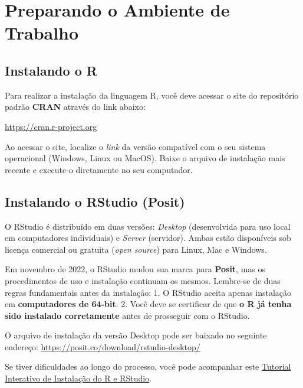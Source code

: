 \documentclass[
  brazilian,
  11pt,
  a4paper,
  open = right,
  twoside = true]{scrbook}
\begin{document}
\section*{Preparando o Ambiente de
Trabalho}\label{preparando-o-ambiente-de-trabalho}


\subsection*{Instalando o R}\label{instalando-o-r}

Para realizar a instalação da linguagem R, você deve acessar o site do
repositório padrão \textbf{CRAN} através do link abaixo:

\url{https://cran.r-project.org}

Ao acessar o site, localize o \emph{link} da versão compatível com o seu
sistema operacional (Windows, Linux ou MacOS). Baixe o arquivo de
instalação mais recente e execute-o diretamente no seu computador.

\subsection*{Instalando o RStudio
(Posit)}\label{instalando-o-rstudio-posit}

O RStudio é distribuído em duas versões: \emph{Desktop} (desenvolvida
para uso local em computadores individuais) e \emph{Server} (servidor).
Ambas estão disponíveis sob licença comercial ou gratuita (\emph{open
source}) para Linux, Mac e Windows.

Em novembro de 2022, o RStudio mudou sua marca para \textbf{Posit}, mas
os procedimentos de uso e instalação continuam os mesmos. Lembre-se de
duas regras fundamentais antes da instalação: 1. O RStudio aceita apenas
instalação em \textbf{computadores de 64-bit}. 2. Você deve se
certificar de que \textbf{o R já tenha sido instalado corretamente}
antes de prosseguir com o RStudio.

O arquivo de instalação da versão Desktop pode ser baixado no seguinte
endereço: \url{https://posit.co/download/rstudio-desktop/}

Se tiver dificuldades ao longo do processo, você pode acompanhar este
\href{https://www.iorad.com/player/1815363/Como-instalar-o-R-e-o-RStudio}{Tutorial
Interativo de Instalação do R e RStudio}.
\end{document}
